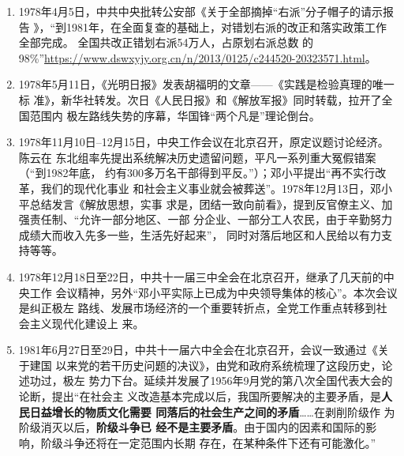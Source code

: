 \begin{enumerate}
\item 1978年4月5日，中共中央批转公安部《关于全部摘掉“右派”分子帽子的请示报告
  》，“到1981年，在全面复查的基础上，对错划右派的改正和落实政策工作全部完成。
  全国共改正错划右派54万人，占原划右派总数
  的98\%”\url{https://www.dswxyjy.org.cn/n/2013/0125/c244520-20323571.html}。

\item 1978年5月11日，《光明日报》发表胡福明的文章——《实践是检验真理的唯一标
  准》，新华社转发。次日《人民日报》和《解放军报》同时转载，拉开了全国范围内
  极左路线失势的序幕，华国锋“两个凡是”理论倒台。


\item 1978年11月10日--12月15日，中央工作会议在北京召开，原定议题讨论经济。陈云在
  东北组率先提出系统解决历史遗留问题，平凡一系列重大冤假错案（“到1982年底，
  约有300多万名干部得到平反。”）；邓小平提出“再不实行改革，我们的现代化事业
  和社会主义事业就会被葬送”。1978年12月13日，邓小平总结发言《解放思想，实事
  求是，团结一致向前看》，提到反官僚主义、加强责任制、“允许一部分地区、一部
  分企业、一部分工人农民，由于辛勤努力成绩大而收入先多一些，生活先好起来”，
  同时对落后地区和人民给以有力支持等等。

\item 1978年12月18日至22日，中共十一届三中全会在北京召开，继承了几天前的中央工作
  会议精神，另外“邓小平实际上已成为中央领导集体的核心”。本次会议是纠正极左
  路线、发展市场经济的一个重要转折点，全党工作重点转移到社会主义现代化建设上
  来。

\item 1981年6月27日至29日，中共十一届六中全会在北京召开，会议一致通过《关于建国
  以来党的若干历史问题的决议》，由党和政府系统梳理了这段历史，论述功过，极左
  势力下台。延续并发展了1956年9月党的第八次全国代表大会的论断，提出“在社会主
  义改造基本完成以后，我国所要解决的主要矛盾，是\textbf{人民日益增长的物质文化需要
    同落后的社会生产之间的矛盾}……在剥削阶级作 为阶级消灭以后，\textbf{阶级斗争已
    经不是主要矛盾}。由于国内的因素和国际的影响，阶级斗争还将在一定范围内长期
  存在，在某种条件下还有可能激化。”


\end{enumerate}
